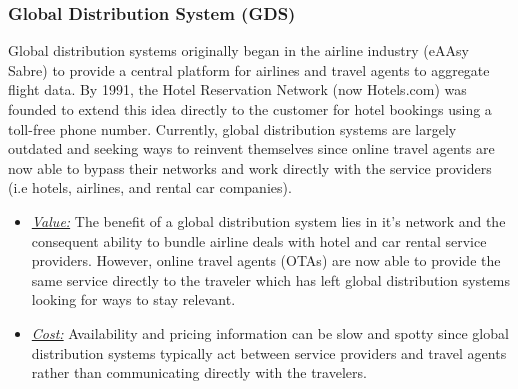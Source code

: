 \documentclass{article}
\begin{document}
\subsubsection{Global Distribution System (GDS)}
Global distribution systems originally began in the airline industry (eAAsy Sabre) to provide a central platform for airlines and travel agents to aggregate flight data. By 1991, the Hotel Reservation Network (now Hotels.com) was founded to extend this idea directly to the customer for hotel bookings using a toll-free phone number. Currently, global distribution systems are largely outdated and seeking ways to reinvent themselves since online travel agents are now able to bypass their networks and work directly with the service providers (i.e hotels, airlines, and rental car companies).
\begin{itemize}
 \item \underline{\textit{Value:}} The benefit of a global distribution system lies in it's network and the consequent ability to bundle airline deals with hotel and car rental service providers. However, online travel agents (OTAs) are now able to provide the same service directly to the traveler which has left global distribution systems looking for ways to stay relevant.
 \item \underline{\textit{Cost:}} Availability and pricing information can be slow and spotty since global distribution systems typically act between service providers and travel agents rather than communicating directly with the travelers. 
\end{itemize}
\end{document}
